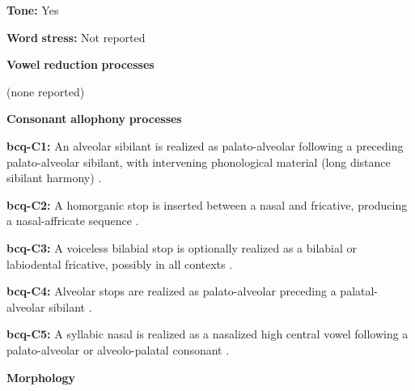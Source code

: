 \documentclass[output=paper]{langsci/langscibook}
\begin{document}
\begin{styleBody}
\textbf{Tone:} Yes
\end{styleBody}

\begin{styleBody}
\textbf{Word} \textbf{stress:} Not reported
\end{styleBody}

\begin{styleBody}
\textbf{Vowel} \textbf{reduction} \textbf{processes}
\end{styleBody}

\begin{styleBody}
(none reported)
\end{styleBody}

\begin{styleBody}
\textbf{Consonant} \textbf{allophony} \textbf{processes}
\end{styleBody}

\begin{styleBody}
\textbf{bcq-C1:} An alveolar sibilant is realized as palato-alveolar following a preceding palato-alveolar sibilant, with intervening phonological material (long distance sibilant harmony) \citep[67]{Rapold2006}.
\end{styleBody}

\begin{styleBody}
\textbf{bcq-C2:} A homorganic stop is inserted between a nasal and fricative, producing a nasal-affricate sequence \citep[69]{Rapold2006}.
\end{styleBody}

\begin{styleBody}
\textbf{bcq-C3:} A voiceless bilabial stop is optionally realized as a bilabial or labiodental fricative, possibly in all contexts \citep[73]{Rapold2006}.
\end{styleBody}

\begin{styleBody}
\textbf{bcq-C4:} Alveolar stops are realized as palato-alveolar preceding a palatal-alveolar sibilant \citep[74]{Rapold2006}.
\end{styleBody}

\begin{styleBody}
\textbf{bcq-C5:} A syllabic nasal is realized as a nasalized high central vowel following a palato-alveolar or alveolo-palatal consonant \citep[76]{Rapold2006}.
\end{styleBody}

\begin{styleBody}
\textbf{Morphology}
\end{styleBody}
\end{document}
